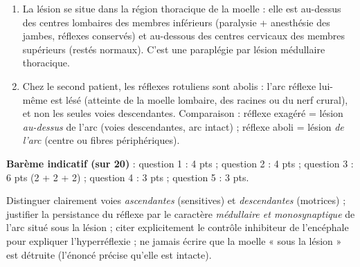 \documentclass[11pt]{article}
\newcommand{\cle}[1]{{\popxbold\color{popdark}#1}}
\begin{document}
\begin{corrige}
\begin{enumerate}
\begin{enumerate}
\end{enumerate}
\item La lésion se situe dans la \cle{région thoracique} de la moelle : elle est au-dessus des centres lombaires des membres inférieurs (paralysie + anesthésie des jambes, réflexes conservés) et au-dessous des centres cervicaux des membres supérieurs (restés normaux). C'est une paraplégie par lésion médullaire thoracique.
\item Chez le second patient, les réflexes rotuliens sont abolis : l'\cle{arc réflexe lui-même est lésé} (atteinte de la moelle lombaire, des racines ou du nerf crural), et non les seules voies descendantes. Comparaison : réflexe exagéré = lésion \emph{au-dessus} de l'arc (voies descendantes, arc intact) ; réflexe aboli = lésion \emph{de l'arc} (centre ou fibres périphériques).
\end{enumerate}
\textbf{Barème indicatif (sur 20)} : question 1 : 4 pts ; question 2 : 4 pts ; question 3 : 6 pts (2 + 2 + 2) ; question 4 : 3 pts ; question 5 : 3 pts.
\end{corrige}

\begin{attention}
Distinguer clairement voies \emph{ascendantes} (sensitives) et \emph{descendantes} (motrices) ; justifier la persistance du réflexe par le caractère \emph{médullaire et monosynaptique} de l'arc situé sous la lésion ; citer explicitement le contrôle inhibiteur de l'encéphale pour expliquer l'hyperréflexie ; ne jamais écrire que la moelle « sous la lésion » est détruite (l'énoncé précise qu'elle est intacte).
\end{attention}
\end{document}
